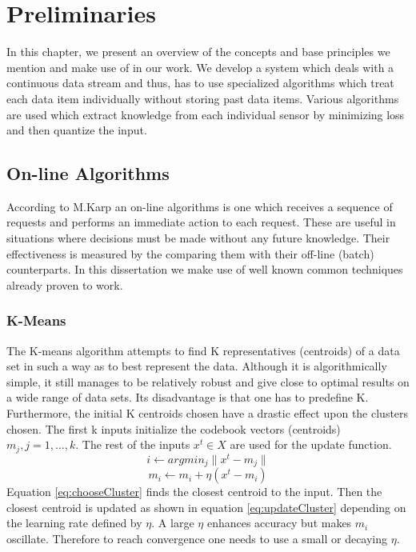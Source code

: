 \documentclass{mproj}
\begin{document}
\chapter{Preliminaries}
In this chapter, we present an overview of the concepts and base principles we mention and make use of in our work. We develop a system which deals with a continuous data stream and thus, has to use specialized algorithms which treat each data item individually without storing past data items. Various algorithms are used which extract knowledge from each individual sensor by minimizing loss and then quantize the input.

\section{On-line Algorithms}
According to M.Karp \cite{Karp} an on-line algorithms is one which receives a sequence of requests and performs an immediate action to each request. These are useful in situations where decisions must be made without any future knowledge. Their effectiveness is measured by the comparing them with their off-line (batch) counterparts. In this dissertation we make use of well known common techniques already proven to work.

\subsection{K-Means}
The K-means algorithm attempts to find K representatives (centroids) of a data set in such a way as to best represent the data. \cite{onlinekmeans} Although it is algorithmically simple, it still manages to be relatively robust and give close to optimal results on a wide range of data sets. Its disadvantage is that one has to predefine K. Furthermore, the initial K centroids chosen have a drastic effect upon the clusters chosen. The first k inputs initialize the codebook vectors (centroids) $m_j,j=1,...,k$. The rest of the inputs $x^t \in X$ are used for the update function.
\begin{equation}
\label{eq:chooseCluster}
i \longleftarrow arg min_j \parallel x^t - m_j \parallel
\end{equation}
\begin{equation}
\label{eq:updateCluster}
m_i \longleftarrow m_i + \eta (x^t - m_i)
\end{equation}
Equation \ref{eq:chooseCluster} finds the closest centroid to the input. Then the closest centroid is updated as shown in equation \ref{eq:updateCluster} depending on the learning rate defined by $\eta$. A large $\eta$ enhances accuracy but makes $m_i$ oscillate. Therefore to reach convergence one needs to use a small or decaying $\eta$.
\end{document}
